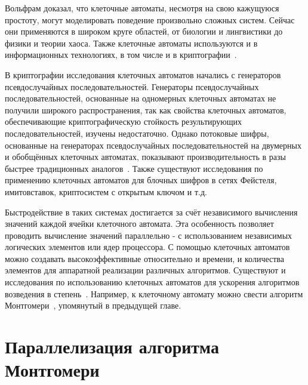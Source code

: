 \documentclass[times,specification,annotation]{itmo-student-thesis}
\begin{document}
Вольфрам доказал, что клеточные автоматы, несмотря на свою кажущуюся простоту, могут моделировать поведение произвольно сложных систем.
Сейчас они применяются в широком круге областей, от биологии и лингвистики до физики и теории хаоса.
Также клеточные автоматы используются и в информационных технологиях, в том числе и в криптографии~\cite{zhu17}.

В криптографии исследования клеточных автоматов начались с генераторов псевдослучайных последовательностей.
Генераторы псевдослучайных последовательностей, основанные на одномерных клеточных автоматах не получили широкого распространения,
так как свойства клеточных автоматов, обеспечивающие криптографическую стойкость результирующих последовательностей,
изучены недостаточно.
Однако потоковые шифры, основанные на генераторах псевдослучайных последовательностей на двумерных и обобщённых
клеточных автоматах, показывают производительность в разы быстрее традиционных аналогов~\cite{zhu17_2}.
Также существуют исследования по применению клеточных автоматов для блочных шифров в сетях Фейстеля, имитовставок,
криптосистем с открытым ключом и т.д.

Быстродействие в таких системах достигается за счёт независимого вычисления значений каждой ячейки клеточного автомата.
Эта особенность позволяет проводить вычисление значений параллельно - с использованием независимых логических элементов или ядер процессора.
С помощью клеточных автоматов можно создавать высокоэффективные относительно и времени, и количества элементов для аппаратной реализации различных алгоритмов.
Существуют и исследования по использованию клеточных автоматов для ускорения алгоритмов возведения в степень~\cite{ku02}.
Например, к клеточному автомату можно свести алгоритм Монтгомери~\cite{jeo07}, упомянутый в предыдущей главе.

\section{Параллелизация алгоритма Монтгомери}\label{sec:paramont}
\end{document}
